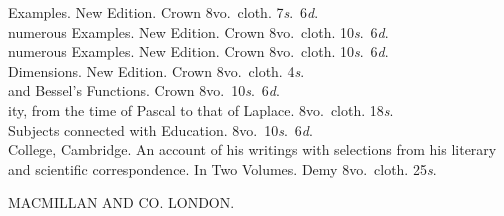 \documentclass{book}[2004/02/16]
\begin{document}
\noindent\hangindent\parindent{\LARGE A Treatise on Conic Sections. With numerous}
\linebreak
Examples. New Edition. Crown 8vo.\ cloth. 7\textit{s}.\ 6\textit{d}.\\[.5ex]

\noindent\hangindent\parindent{\LARGE A Treatise on the Differential Calculus. With}
\linebreak
numerous Examples. New Edition. Crown 8vo.\ cloth. 10\textit{s}.\ 6\textit{d}.\\[.5ex]

\noindent\hangindent\parindent{\LARGE A Treatise on the Integral Calculus. With}
\linebreak
numerous Examples. New Edition. Crown 8vo.\ cloth. 10\textit{s}.\ 6\textit{d}.\\[.5ex]

\noindent\hangindent\parindent{\LARGE Examples of Analytical Geometry of Three}
\linebreak
Dimensions. New Edition. Crown 8vo.\ cloth. 4\textit{s}.\\[.5ex]

\noindent\hangindent\parindent{\LARGE An Elementary Treatise on Laplace's, Lam\'e's,}
\linebreak
and Bessel's Functions. Crown 8vo.\ 10\textit{s}.\ 6\textit{d}.\\[.5ex]

\noindent\hangindent\parindent{\LARGE A History of the Mathematical Theory of Probabil-}
\linebreak
ity, from the time of Pascal to that of Laplace. 8vo.\ cloth. 18\textit{s}.\\[.5ex]

\noindent\hangindent\parindent{\LARGE The Conflict of Studies, and other Essays on}
\linebreak
Subjects connected with Education. 8vo.\ 10\textit{s}.\ 6\textit{d}.\\[.5ex]

\noindent\hangindent\parindent{\LARGE William Whewell, D.D.\ Master of Trinity}
\linebreak
College, Cambridge. An account of his writings with selections
from his literary and scientific correspondence. In Two Volumes.
Demy 8vo.\ cloth. 25\textit{s}.\\[.5ex]


\vfill
\begin{center}
\noindent\hrulefill\nopagebreak\par
\small
MACMILLAN AND CO\@. LONDON.
\end{center}
\end{document}
